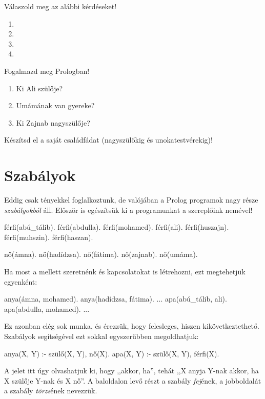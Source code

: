 \begin{problem}
Válaszold meg az alábbi kérdéseket!
\begin{enumerate}
\item {}
\item {}
\item {}
\item {}
\end{enumerate}
\end{problem}
\begin{problem}
Fogalmazd meg Prologban!
\begin{enumerate}
\item Ki Ali szülője?
\item Umámának van gyereke?
\item Ki Zajnab nagyszülője?
\end{enumerate}
\end{problem}
\begin{problem}
Készítsd el a saját családfádat (nagyszülőkig
és unokatestvérekig)!
\end{problem}

\section{Szabályok}

Eddig csak tényekkel foglalkoztunk, de valójában a
Prolog programok nagy része \emph{szabályokból}
áll. Először is egészítsük ki a programunkat a
szereplőink nemével!

\begin{program}
férfi(abú_tálib).
férfi(abdulla).
férfi(mohamed).
férfi(ali).
férfi(huszajn).
férfi(muhszin).
férfi(haszan).

nő(ámna).
nő(hadídzsa).
nő(fátima).
nő(zajnab).
nő(umáma).
\end{program}

Ha most a  mellett szeretnénk  és
 kapcsolatokat is létrehozni, ezt
megtehetjük egyenként:
\begin{program}
anya(ámna, mohamed).
anya(hadídzsa, fátima).
...
apa(abú_tálib, ali).
apa(abdulla, mohamed).
...
\end{program}
Ez azonban elég sok munka, és érezzük, hogy
felesleges, hiszen kikövetkeztethető.  Szabályok
segítségével ezt sokkal egyszerűbben megoldhatjuk:
\begin{program}
anya(X, Y) :- szülő(X, Y), nő(X).
apa(X, Y) :- szülő(X, Y), férfi(X).
\end{program}
A \pr{:-} jelet itt úgy olvashatjuk ki, hogy
,,akkor, ha'', tehát ,,X anyja Y-nak akkor, ha X
szülője Y-nak és X nő''. A baloldalon levő részt a
szabály \emph{fej}\/ének, a jobboldalát a szabály
\emph{törzs}\/ének nevezzük.

